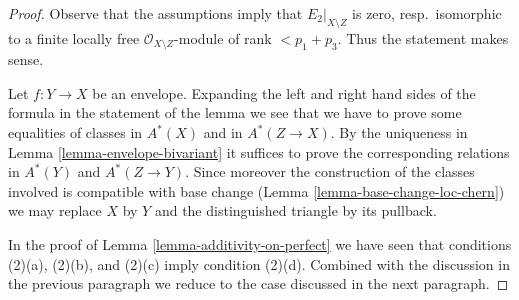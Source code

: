 \begin{proof}
Observe that the assumptions imply that $E_2|_{X \setminus Z}$ is zero,
resp.\ isomorphic to a finite locally free $\mathcal{O}_{X \setminus Z}$-module
of rank $< p_1 + p_3$. Thus the statement makes sense.

\medskip\noindent
Let $f : Y \to X$ be an envelope. Expanding the left and right hand sides
of the formula in the statement of the lemma we see that we have to prove
some equalities of classes in $A^*(X)$ and in $A^*(Z \to X)$. By the
uniqueness in Lemma \ref{lemma-envelope-bivariant} it suffices to prove the
corresponding relations in $A^*(Y)$ and $A^*(Z \to Y)$. Since moreover
the construction of the classes involved is compatible with base change
(Lemma \ref{lemma-base-change-loc-chern}) we may replace $X$ by $Y$
and the distinguished triangle by its pullback.

\medskip\noindent
In the proof of Lemma \ref{lemma-additivity-on-perfect} we have
seen that conditions (2)(a), (2)(b), and (2)(c) imply condition
(2)(d). Combined with the discussion in the previous paragraph we
reduce to the case discussed in the next paragraph.


\end{proof}
